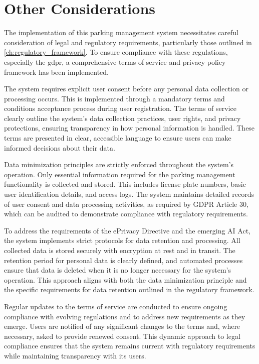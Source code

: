 \section{Other Considerations}

The implementation of this parking management system necessitates careful consideration of legal and regulatory requirements, particularly those outlined in \cref{ch:regulatory_framework}. To ensure compliance with these regulations, especially the \gls{gdpr}, a comprehensive terms of service and privacy policy framework has been implemented.

The system requires explicit user consent before any personal data collection or processing occurs. This is implemented through a mandatory terms and conditions acceptance process during user registration. The terms of service clearly outline the system's data collection practices, user rights, and privacy protections, ensuring transparency in how personal information is handled. These terms are presented in clear, accessible language to ensure users can make informed decisions about their data.

Data minimization principles are strictly enforced throughout the system's operation. Only essential information required for the parking management functionality is collected and stored. This includes license plate numbers, basic user identification details, and access logs. The system maintains detailed records of user consent and data processing activities, as required by GDPR Article 30, which can be audited to demonstrate compliance with regulatory requirements.

To address the requirements of the ePrivacy Directive and the emerging AI Act, the system implements strict protocols for data retention and processing. All collected data is stored securely with encryption at rest and in transit. The retention period for personal data is clearly defined, and automated processes ensure that data is deleted when it is no longer necessary for the system's operation. This approach aligns with both the data minimization principle and the specific requirements for data retention outlined in the regulatory framework.

Regular updates to the terms of service are conducted to ensure ongoing compliance with evolving regulations and to address new requirements as they emerge. Users are notified of any significant changes to the terms and, where necessary, asked to provide renewed consent. This dynamic approach to legal compliance ensures that the system remains current with regulatory requirements while maintaining transparency with its users.


